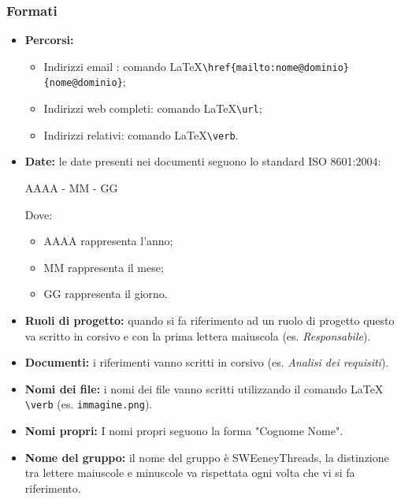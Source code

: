 \documentclass[a4paper]{report}
\begin{document}
	\subsubsection{Formati}
	\begin{itemize}
		\item \textbf{Percorsi:} 
		\begin{itemize}
			\item Indirizzi email : comando \LaTeX \space \verb|\href{mailto:nome@dominio}{nome@dominio}|;
			\item Indirizzi web completi: comando \LaTeX \space \verb|\url|;
			\item Indirizzi relativi: comando \LaTeX  \space \verb|\verb|.
		\end{itemize}
		\item \textbf{Date:} le date presenti nei documenti seguono lo standard ISO 8601:2004:
		\begin{center}
			AAAA - MM - GG
		\end{center}
		Dove:
		\begin{itemize}
			\item AAAA rappresenta l'anno;
			\item MM rappresenta il mese;
			\item GG rappresenta il giorno.
		\end{itemize}
		\item \textbf{Ruoli di progetto:} quando si fa riferimento ad un ruolo di progetto questo va scritto in corsivo
		e con la prima lettera maiuscola (es. \textit{Responsabile}).
		\item \textbf{Documenti:} i riferimenti vanno scritti in corsivo (es. \textit{Analisi dei requisiti}).
		\item \textbf{Nomi dei file:} i nomi dei file vanno scritti utilizzando il comando \LaTeX \space 
		\verb|\verb| (es. \verb|immagine.png|).
		\item \textbf{Nomi propri:} I nomi propri seguono la forma "Cognome Nome".
		\item \textbf{Nome del gruppo:} il nome del gruppo è SWEeneyThreads, la distinzione tra lettere maiuscole e
		minuscole va rispettata ogni volta che vi si fa riferimento.
	\end{itemize}
\end{document}
